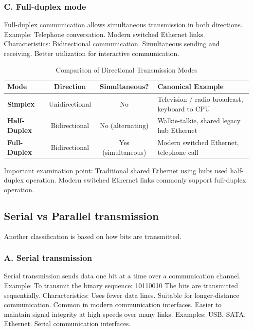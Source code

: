 \subsubsection{C. Full-duplex mode}
Full-duplex communication allows simultaneous transmission in both directions.
Example:
Telephone conversation.
Modern switched Ethernet links.
Characteristics:
Bidirectional communication.
Simultaneous sending and receiving.
Better utilization for interactive communication.
\begin{table}[htbp]
\centering
\caption{Comparison of Directional Transmission Modes}
\label{tab:transmission_modes}
\begin{tabularx}{\textwidth}{p{3.2cm} c c X}
\toprule
\textbf{Mode} & \textbf{Direction} & \textbf{Simultaneous?} & \textbf{Canonical Example} \\
\midrule
\textbf{Simplex} & Unidirectional & No & Television / radio broadcast, keyboard to CPU \\
\textbf{Half-Duplex} & Bidirectional & No (alternating) & Walkie-talkie, shared legacy hub Ethernet \\
\textbf{Full-Duplex} & Bidirectional & Yes (simultaneous) & Modern switched Ethernet, telephone call \\
\bottomrule
\end{tabularx}
\end{table}
Important examination point: Traditional shared Ethernet using hubs used half-duplex operation. Modern switched Ethernet links commonly support full-duplex operation.
\subsection{Serial vs Parallel transmission}
Another classification is based on how bits are transmitted.
\subsubsection{A. Serial transmission}
Serial transmission sends data one bit at a time over a communication channel.
Example:
To transmit the binary sequence:
10110010
The bits are transmitted sequentially.
Characteristics:
Uses fewer data lines.
Suitable for longer-distance communication.
Common in modern communication interfaces.
Easier to maintain signal integrity at high speeds over many links.
Examples:
USB.
SATA.
Ethernet.
Serial communication interfaces.
